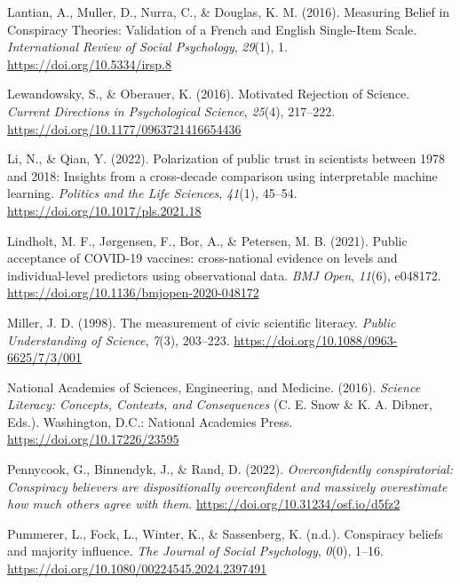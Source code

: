 \documentclass[
  doc,floatsintext]{apa6}
\newlength{\cslhangindent}
\newenvironment{CSLReferences}[2] %
 {\begin{list}{}{%
  \setlength{\itemindent}{0pt}
  \setlength{\leftmargin}{0pt}
  \setlength{\parsep}{0pt}
  \ifodd #1
   \setlength{\leftmargin}{\cslhangindent}
   \setlength{\itemindent}{-1\cslhangindent}
  \fi
  \setlength{\itemsep}{#2\baselineskip}}}
 {\end{list}}
\begin{document}
\begin{CSLReferences}{1}{0}
Lantian, A., Muller, D., Nurra, C., \& Douglas, K. M. (2016). Measuring Belief in Conspiracy Theories: Validation of a French and English Single-Item Scale. \emph{International Review of Social Psychology}, \emph{29}(1), 1. \url{https://doi.org/10.5334/irsp.8}

Lewandowsky, S., \& Oberauer, K. (2016). Motivated Rejection of Science. \emph{Current Directions in Psychological Science}, \emph{25}(4), 217--222. \url{https://doi.org/10.1177/0963721416654436}

Li, N., \& Qian, Y. (2022). Polarization of public trust in scientists between 1978 and 2018: Insights from a cross-decade comparison using interpretable machine learning. \emph{Politics and the Life Sciences}, \emph{41}(1), 45--54. \url{https://doi.org/10.1017/pls.2021.18}

Lindholt, M. F., Jørgensen, F., Bor, A., \& Petersen, M. B. (2021). Public acceptance of COVID-19 vaccines: cross-national evidence on levels and individual-level predictors using observational data. \emph{BMJ Open}, \emph{11}(6), e048172. \url{https://doi.org/10.1136/bmjopen-2020-048172}

Miller, J. D. (1998). The measurement of civic scientific literacy. \emph{Public Understanding of Science}, \emph{7}(3), 203--223. \url{https://doi.org/10.1088/0963-6625/7/3/001}

National Academies of Sciences, Engineering, and Medicine. (2016). \emph{Science Literacy: Concepts, Contexts, and Consequences} (C. E. Snow \& K. A. Dibner, Eds.). Washington, D.C.: National Academies Press. \url{https://doi.org/10.17226/23595}

Pennycook, G., Binnendyk, J., \& Rand, D. (2022). \emph{Overconfidently conspiratorial: Conspiracy believers are dispositionally overconfident and massively overestimate how much others agree with them}. \url{https://doi.org/10.31234/osf.io/d5fz2}

Pummerer, L., Fock, L., Winter, K., \& Sassenberg, K. (n.d.). Conspiracy beliefs and majority influence. \emph{The Journal of Social Psychology}, \emph{0}(0), 1--16. \url{https://doi.org/10.1080/00224545.2024.2397491}


\end{CSLReferences}
\end{document}
